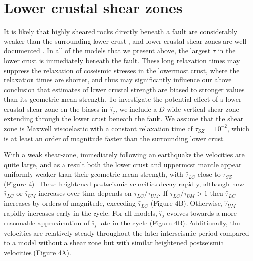 \section{Lower crustal shear zones}
It is likely that highly sheared rocks directly beneath a fault are considerably weaker than the surrounding lower crust \citep[{\it e.g.},][]{Montesi2003}, and lower crustal shear zones are well documented \citep[{\it e.g.},][]{Vauchez2003}. In all of the models that we present above, the largest $\tau$ in the lower crust is immediately beneath the fault.  These long relaxation times may suppress the relaxation of coseismic stresses in the lowermost crust, where the relaxation times are shorter, and thus may significantly influence our above conclusion that estimates of lower crustal strength are biased to stronger values than its geometric mean strength. To investigate the potential effect of a lower crustal shear zone on the biases in $\hat{\tau}_j$, we include a $D$ wide vertical shear zone extending through the lower crust beneath the fault.  We assume that the shear zone is Maxwell viscoelastic with a constant relaxation time of $\tau_{SZ} = 10^{-2}$, which is at least an order of magnitude faster than the surrounding lower crust. 

With a weak shear-zone, immediately following an earthquake the velocities are quite large, and as a result both the lower crust and uppermost mantle appear uniformly weaker than their geometric mean strength, with $\hat{\tau}_{LC}$ close to $\tau_{SZ}$ (Figure 4). These heightened postseismic velocities decay rapidly, although how $\hat{\tau}_{LC}$ or $\hat{\tau}_{UM}$ increases over time depends on $\bar{\tau}_{LC}/\bar{\tau}_{UM}$. If $\bar{\tau}_{LC}/\bar{\tau}_{UM} > 1$ then $\hat{\tau}_{LC}$ increases by orders of magnitude, exceeding $\bar{\tau}_{LC}$  (Figure 4B).  Otherwise, $\hat{\tau}_{UM}$ rapidly increases early in the cycle. For all models,  $\hat{\tau}_j$ evolves towards a more reasonable approximation of $\bar{\tau}_j$ late in the cycle  (Figure 4B). Additionally, the velocities are relatively steady throughout the later interseismic period compared to a model without a shear zone but with similar heightened postseismic velocities (Figure 4A).

